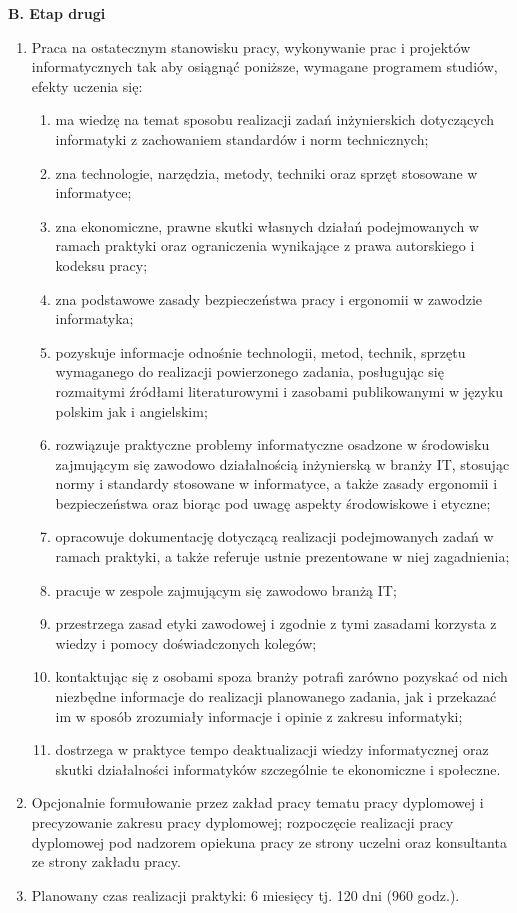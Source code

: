 \documentclass[12pt,a4paper]{article}
\begin{document}
\vspace{0.5em}
\noindent \textbf{B. Etap drugi}
\begin{enumerate}[label=\arabic*), leftmargin=*]
    \item Praca na ostatecznym stanowisku pracy, wykonywanie prac i projektów informatycznych tak aby osiągnąć poniższe, wymagane programem studiów, efekty uczenia się:
    \begin{enumerate}[label=\alph*)]
        \item ma wiedzę na temat sposobu realizacji zadań inżynierskich dotyczących informatyki z zachowaniem standardów i norm technicznych;
        \item zna technologie, narzędzia, metody, techniki oraz sprzęt stosowane w informatyce;
        \item zna ekonomiczne, prawne skutki własnych działań podejmowanych w ramach praktyki oraz ograniczenia wynikające z prawa autorskiego i kodeksu pracy;
        \item zna podstawowe zasady bezpieczeństwa pracy i ergonomii w zawodzie informatyka;
        \item pozyskuje informacje odnośnie technologii, metod, technik, sprzętu wymaganego do realizacji powierzonego zadania, posługując się rozmaitymi źródłami literaturowymi i zasobami publikowanymi w języku polskim jak i angielskim;
        \item rozwiązuje praktyczne problemy informatyczne osadzone w środowisku zajmującym się zawodowo działalnością inżynierską w branży IT, stosując normy i standardy stosowane w informatyce, a także zasady ergonomii i bezpieczeństwa oraz biorąc pod uwagę aspekty środowiskowe i etyczne;
        \item opracowuje dokumentację dotyczącą realizacji podejmowanych zadań w ramach praktyki, a także referuje ustnie prezentowane w niej zagadnienia;
        \item pracuje w zespole zajmującym się zawodowo branżą IT;
        \item przestrzega zasad etyki zawodowej i zgodnie z tymi zasadami korzysta z wiedzy i pomocy doświadczonych kolegów;
        \item kontaktując się z osobami spoza branży potrafi zarówno pozyskać od nich niezbędne informacje do realizacji planowanego zadania, jak i przekazać im w sposób zrozumiały informacje i opinie z zakresu informatyki;
        \item dostrzega w praktyce tempo deaktualizacji wiedzy informatycznej oraz skutki działalności informatyków szczególnie te ekonomiczne i społeczne.
    \end{enumerate}
    \item Opcjonalnie formułowanie przez zakład pracy tematu pracy dyplomowej i precyzowanie zakresu pracy dyplomowej; rozpoczęcie realizacji pracy dyplomowej pod nadzorem opiekuna pracy ze strony uczelni oraz konsultanta ze strony zakładu pracy.
    \item Planowany czas realizacji praktyki: 6 miesięcy tj. 120 dni (960 godz.).
\end{enumerate}
\end{document}
